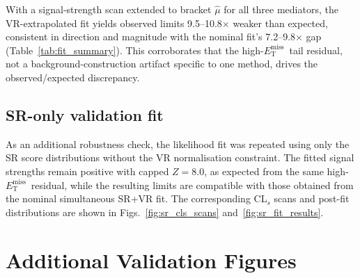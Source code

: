 \documentclass[11pt,a4paper,twocolumn]{article}
\newcommand{\MET}{\ensuremath{E_{\mathrm{T}}^{\mathrm{miss}}}}
\begin{document}
With a signal-strength scan extended to bracket \(\hat{\mu}\) for all three
mediators, the VR-extrapolated fit yields observed limits 9.5--10.8\(\times\)
weaker than expected, consistent in direction and magnitude with the nominal
fit's 7.2--9.8\(\times\) gap (Table~\ref{tab:fit_summary}). This corroborates
that the high-\MET\ tail residual, not a background-construction artifact
specific to one method, drives the observed/expected discrepancy.
\subsection{SR-only validation fit}
\label{app:sr-only-fit}
As an additional robustness check, the likelihood fit was repeated using
only the SR score distributions without the VR normalisation constraint.
The fitted signal strengths remain positive with capped \(Z=8.0\), as expected
from the same high-\MET\ residual, while the resulting limits are compatible with those
obtained from the nominal simultaneous SR+VR fit.
The corresponding CL$_s$ scans and post-fit distributions are shown in
Figs.~\ref{fig:sr_cls_scans} and~\ref{fig:sr_fit_results}.
\begin{table}[h]
\centering
\caption{SR-only validation fit. The fitted signal strengths remain positive
with capped \(Z=8.0\), as expected from the same high-\MET\ residual, while
the resulting limits are compatible with those obtained from the nominal
simultaneous SR+VR fit. The \(Z\) values
are capped as in Table~\ref{tab:fit_summary}.}
\label{tab:appendix-sr-fit}
\end{table}
\clearpage
\section{Additional Validation Figures}
\label{app:results-figures}
\end{document}
